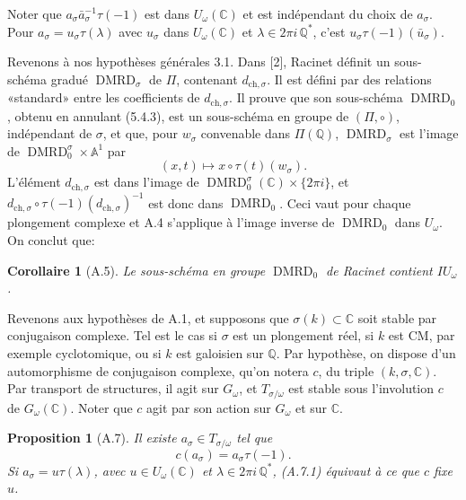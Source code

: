 \documentclass[10pt,a4paper]{article}
\newcommand{\Q}{\mathbb Q}
\newcommand{\A}{\mathbb A}
\newcommand{\C}{\mathbb C}
\newcommand{\DMRD}{\operatorname{DMRD}}
\theoremstyle{deligne}
\newtheorem*{proposition*}{Proposition}
\newtheorem*{corollary*}{Corollaire}
\newcommand{\heading}[1]{\vspace{0.65em}\noindent{\bfseries #1}\quad}
\begin{document}
Noter que \(a_\sigma\bar a_\sigma^{-1}\tau(-1)\) est dans \(U_\omega(\C)\) et est indépendant du choix de \(a_\sigma\). Pour \(a_\sigma=u_\sigma\tau(\lambda)\) avec \(u_\sigma\) dans \(U_\omega(\C)\) et \(\lambda\in2\pi i\,\Q^*\), c'est \(u_\sigma\tau(-1)(\bar u_\sigma)\).

\heading{A.5.} Revenons à nos hypothèses générales 3.1. Dans [2], Racinet définit un sous-schéma gradué \(\DMRD_\sigma\) de \(\Pi\), contenant \(d_{\mathrm{ch},\sigma}\). Il est défini par des relations «standard» entre les coefficients de \(d_{\mathrm{ch},\sigma}\). Il prouve que son sous-schéma \(\DMRD_0\), obtenu en annulant (5.4.3), est un sous-schéma en groupe de \((\Pi,\circ)\), indépendant de \(\sigma\), et que, pour \(w_\sigma\) convenable dans \(\Pi(\Q)\), \(\DMRD_\sigma\) est l'image de \(\DMRD_0^\sigma\times\A^1\) par
\[
(x,t)\longmapsto x\circ\tau(t)(w_\sigma).
\]
L'élément \(d_{\mathrm{ch},\sigma}\) est dans l'image de \(\DMRD_0^\sigma(\C)\times\{2\pi i\}\), et \(d_{\mathrm{ch},\sigma}\circ\tau(-1)(d_{\mathrm{ch},\sigma})^{-1}\) est donc dans \(\DMRD_0\). Ceci vaut pour chaque plongement complexe et A.4 s'applique à l'image inverse de \(\DMRD_0\) dans \(U_\omega\). On conclut que:

\begin{corollary*}[A.5]
Le sous-schéma en groupe \(\DMRD_0\) de Racinet contient \(IU_\omega\).
\end{corollary*}

\heading{A.6.} Revenons aux hypothèses de A.1, et supposons que \(\sigma(k)\subset\C\) soit stable par conjugaison complexe. Tel est le cas si \(\sigma\) est un plongement réel, si \(k\) est CM, par exemple cyclotomique, ou si \(k\) est galoisien sur \(\Q\). Par hypothèse, on dispose d'un automorphisme de conjugaison complexe, qu'on notera \(c\), du triple \((k,\sigma,\C)\). Par transport de structures, il agit sur \(G_\omega\), et \(T_{\sigma/\omega}\) est stable sous l'involution \(c\) de \(G_\omega(\C)\). Noter que \(c\) agit par son action sur \(G_\omega\) et sur \(\C\).

\begin{proposition*}[A.7]
Il existe \(a_\sigma\in T_{\sigma/\omega}\) tel que
\[
\tag{A.7.1}
c(a_\sigma)=a_\sigma\tau(-1).
\]
Si \(a_\sigma=u\tau(\lambda)\), avec \(u\in U_\omega(\C)\) et \(\lambda\in2\pi i\,\Q^*\), (A.7.1) équivaut à ce que \(c\) fixe \(u\).
\end{proposition*}
\end{document}
